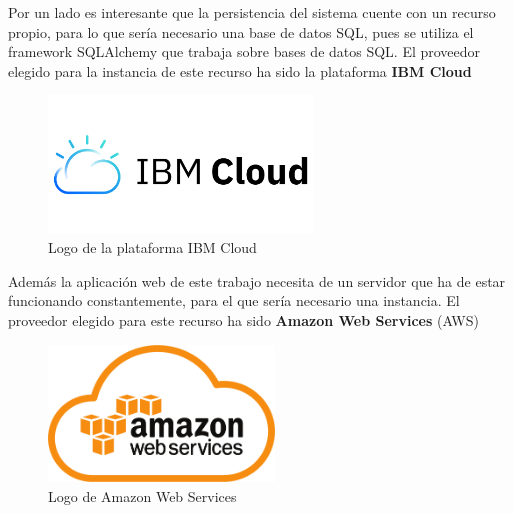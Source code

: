 Por un lado es interesante que la persistencia del sistema cuente con un recurso propio, para lo que sería necesario una base de datos SQL, pues se utiliza el framework SQLAlchemy que trabaja sobre bases de datos SQL. El proveedor elegido para la instancia de este recurso ha sido la plataforma \textbf{IBM Cloud}
\begin{figure}[H]
            \centering
            \includegraphics[width=7cm]{figs/ibm_logo.png}
            \caption{Logo de la plataforma IBM Cloud}
            \label{fig:IBMCloud}
\end{figure}
Además la aplicación web de este trabajo necesita de un servidor que ha de estar funcionando constantemente, para el que sería necesario una instancia. El proveedor elegido para este recurso ha sido \textbf{Amazon Web Services} (AWS)
\begin{figure}[H]
            \centering
            \includegraphics[width=6cm]{figs/aws_logo.png}
            \caption{Logo de Amazon Web Services}
            \label{fig:AWS}
\end{figure}
